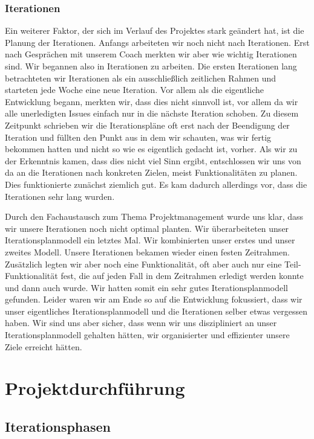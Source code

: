 \documentclass[10pt]{article}
\begin{document}
\subsubsection{Iterationen}
Ein weiterer Faktor, der sich im Verlauf des Projektes stark geändert hat, ist die Planung der Iterationen.
Anfangs arbeiteten wir noch nicht nach Iterationen. Erst nach Gesprächen mit unserem Coach merkten wir aber
wie wichtig Iterationen sind. Wir begannen also in Iterationen zu arbeiten. Die ersten Iterationen lang
betrachteten wir Iterationen als ein ausschließlich zeitlichen Rahmen und starteten jede Woche eine neue Iteration.
Vor allem als die eigentliche Entwicklung begann, merkten wir, dass dies nicht sinnvoll ist, vor allem
da wir alle unerledigten Issues einfach nur in die nächste Iteration schoben. Zu diesem Zeitpunkt schrieben wir
die Iterationspläne oft erst nach der Beendigung der Iteration und füllten den Punkt  aus in dem
wir schauten, was wir fertig bekommen hatten und nicht so wie es eigentlich gedacht ist, vorher.
Als wir zu der Erkenntnis kamen, dass dies nicht viel Sinn ergibt, entschlossen wir uns von da an
die Iterationen nach konkreten Zielen, meist Funktionalitäten zu planen. Dies funktionierte zunächst ziemlich gut.
Es kam dadurch allerdings vor, dass die Iterationen sehr lang wurden.\par
\medskip
Durch den Fachaustausch zum Thema Projektmanagement wurde uns klar, dass wir unsere Iterationen noch nicht optimal planten.
Wir überarbeiteten unser Iterationsplanmodell ein letztes Mal. Wir kombinierten unser erstes und unser zweites Modell.
Unsere Iterationen bekamen wieder einen festen Zeitrahmen. Zusätzlich legten wir aber noch eine Funktionalität, oft
aber auch nur eine Teil-Funktionalität fest, die auf jeden Fall in dem Zeitrahmen erledigt werden konnte und dann auch wurde.
Wir hatten somit ein sehr gutes Iterationsplanmodell gefunden. Leider waren wir am Ende so auf die
Entwicklung fokussiert, dass wir unser eigentliches Iterationsplanmodell und die Iterationen selber etwas vergessen
haben. Wir sind uns aber sicher, dass wenn wir uns diszipliniert an unser Iterationsplanmodell gehalten hätten,
wir organisierter und effizienter unsere Ziele erreicht hätten.

\newpage
\section{Projektdurchführung}
\subsection{Iterationsphasen}
\end{document}
